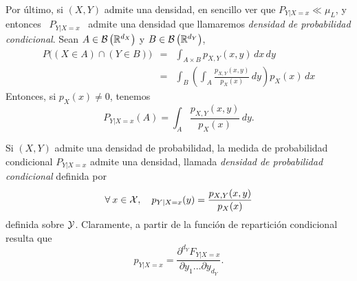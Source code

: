 %

Por \'ultimo, si $(X,Y)$ admite una densidad, en sencillo ver que $P_{Y|X=x} \ll
\mu_L$,  y entonces  \ $P_{Y|X=x}$  \ admite  una densidad  que  llamaremos {\it
  densidad  de  probabilidad  condicional}.  Sean $A  \in  \mathcal{B}\left(  \mathbb{R}^{d_X}
\right)$ y $B \in \mathcal{B}\left( \mathbb{R}^{d_Y} \right)$,
%
\begin{eqnarray*}
P\Big( (X \in A) \cap (Y \in B) \Big) & = & \int_{A \times B} p_{X,Y}(x,y) \, dx \, dy\\[2mm]
%
& = & \int_B \left( \int_A \frac{p_{X,Y}(x,y)}{p_X(x)} \, dy \right) p_X(x) \, dx
\end{eqnarray*}
%
Entonces, si $p_X(x) \ne 0$, tenemos
%
\[
P_{Y|X=x}(A) = \int_A \frac{p_{X,Y}(x,y)}{p_X(x)} \, dy.
\]
%
\begin{teorema}
\label{Def:MP:DensidadCondicional}
%
  Si  $(X,Y)$ admite  una densidad  de probabilidad,  la medida  de probabilidad
  condicional  $P_{Y|X=x}$  admite  una   densidad,  llamada  {\it  densidad  de
    probabilidad condicional} definida por
  \[
  \forall \: x \in \mathcal{X}, \quad p_{Y|X=x}(y) = \frac{p_{X,Y}(x,y)}{p_X(x)}
  \]
  definida  sobre $\mathcal{Y}$. Claramente,  a partir de  la funci\'on  de repartici\'on
  condicional resulta que
  \[
  p_{Y|X=x} = \frac{\partial^{d_Y}  F_{Y|X=x}}{\partial y_1 \ldots \partial y_{d_Y}}.
  \]
\end{teorema}


